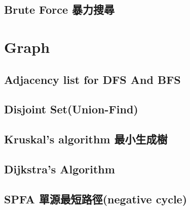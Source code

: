 \subsection{Brute Force 暴力搜尋}






\section{Graph}

\subsection{Adjacency list for DFS And BFS}


\subsection{Disjoint Set(Union-Find)}


\subsection{Kruskal’s algorithm 最小生成樹}


\subsection{Dijkstra’s Algorithm}


%

%

\subsection{SPFA 單源最短路徑(negative cycle)}



